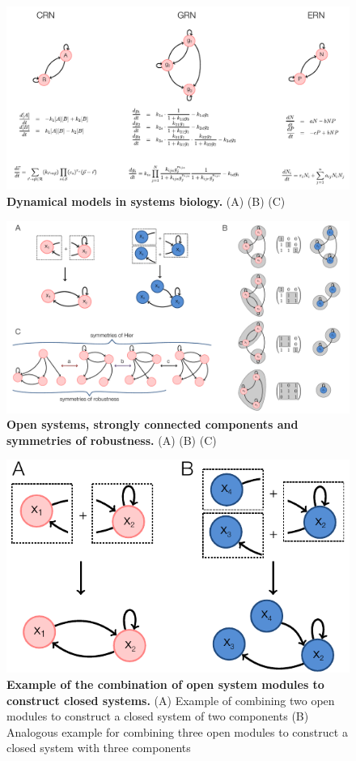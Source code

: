 
\begin{figure}[!ht]
\centering
\noindent\includegraphics[width=0.9\columnwidth]{fig/biomodelexamples.pdf}
\caption{{\bf Dynamical models in systems biology.} (A) (B) (C)}
\label{fig:biomodelexamples}
\end{figure}

\pagebreak

\begin{figure}[!ht]
\centering
\noindent\includegraphics[width=0.9\columnwidth]{fig/modsccsym.pdf}
\caption{{\bf Open systems, strongly connected components and symmetries of robustness.} (A) (B) (C)}
\label{fig:modsccsym}
\end{figure}

\pagebreak


\begin{figure}[!ht]
\centering
\noindent\includegraphics[width=0.4\columnwidth]{fig/examplesystemmodules.pdf}
\caption{{\bf Example of the combination of open system modules to construct closed systems.} (A) Example of combining two open modules to construct a closed system of two components (B) Analogous example for combining three open modules to construct a closed system with three components}
\label{fig:examplesystemmodules}
\end{figure}


